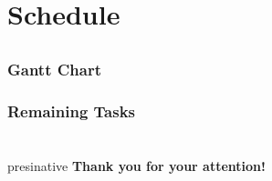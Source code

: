 \documentclass[hyperref={pdfpagelabels=false}]{beamer}
\begin{document}
\section{Schedule}
\subsection{}
\begin{frame}
    \frametitle{Gantt Chart}
\end{frame}

\begin{frame}
    \frametitle{Remaining Tasks}
\end{frame}

\section{}
\begin{frame}
	\hfill
	\begin{beamercolorbox}[shadow=true, rounded=true, wd=10cm]{presinative}
		\centering
		\Large{\textbf{Thank you for your attention!}}
	\end{beamercolorbox}
	\hfill
\end{frame}
\end{document}

